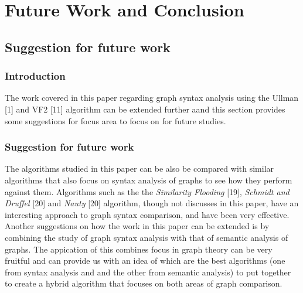 \section{Future Work and Conclusion}

\subsection{Suggestion for future work}
\label{Suggestion for future work}
\subsubsection{Introduction}
The work covered in this paper regarding graph syntax analysis using the Ullman [1] and VF2 [11] algorithm can be extended further aand this section provides 
some suggestions for focus area to focus on for future studies.

\subsubsection{Suggestion for future work}
The algorithms studied in this paper can be also be compared with similar algorithms that also focus on syntax analysis of graphs to see how they perform 
against them. Algorithms such as the the \textit{Similarity Flooding} [19], \textit{Schmidt and Druffel} [20] and \textit{Nauty} [20] algorithm, though not discusses in this paper, have an interesting approach 
to graph syntax comparison, and have been very effective. \newline\newline
Another suggestions on how the work in this paper can be extended is by combining the study of graph syntax analysis with that of semantic analysis of graphs.
 The appication of this combines focus in graph theory can be very fruitful and can provide us with an idea of which are the best algorithms (one from syntax analysis and
 and the other from semantic analysis) to put together to create a hybrid algorithm that focuses on both areas of graph comparison.


